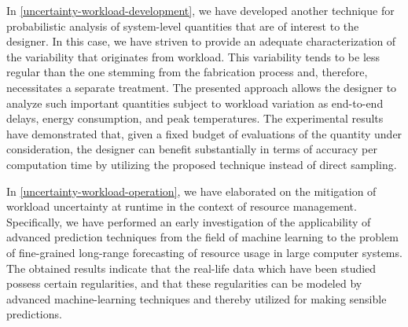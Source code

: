 In \cref{uncertainty-workload-development}, we have developed another technique
for probabilistic analysis of system-level quantities that are of interest to
the designer. In this case, we have striven to provide an adequate
characterization of the variability that originates from workload. This
variability tends to be less regular than the one stemming from the fabrication
process and, therefore, necessitates a separate treatment. The presented
approach allows the designer to analyze such important quantities subject to
workload variation as end-to-end delays, energy consumption, and peak
temperatures. The experimental results have demonstrated that, given a fixed
budget of evaluations of the quantity under consideration, the designer can
benefit substantially in terms of accuracy per computation time by utilizing the
proposed technique instead of direct sampling.

In \cref{uncertainty-workload-operation}, we have elaborated on the mitigation
of workload uncertainty at runtime in the context of resource management.
Specifically, we have performed an early investigation of the applicability of
advanced prediction techniques from the field of machine learning to the problem
of fine-grained long-range forecasting of resource usage in large computer
systems. The obtained results indicate that the real-life data which have been
studied possess certain regularities, and that these regularities can be modeled
by advanced machine-learning techniques and thereby utilized for making sensible
predictions.
